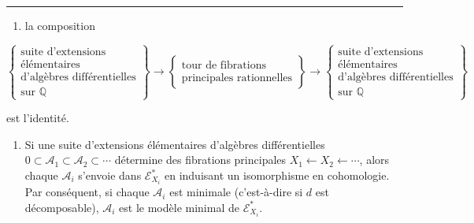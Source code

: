 \documentclass[
  french,
  a3paper,
  a3paper]{extarticle}
\providecommand{\tightlist}{%
  \setlength{\itemsep}{0pt}\setlength{\parskip}{0pt}}
\begin{document}


\par

\vspace{0.7mm}\hrule\vspace{1.6mm}

\fontsize{9}{11}\selectfont

\begin{enumerate}
\def\labelenumi{\arabic{enumi})}
\setcounter{enumi}{1}
\tightlist
\item
  la composition
\end{enumerate}

\[\left\{\begin{array}{c}\text{suite d'extensions}\\\text{élémentaires}\\\text{d'algèbres différentielles}\\\text{sur }\mathbb Q\end{array}\right\}\longrightarrow\left\{\begin{array}{c}\text{tour de fibrations}\\\text{principales rationnelles}\end{array}\right\}\longrightarrow\left\{\begin{array}{c}\text{suite d'extensions}\\\text{élémentaires}\\\text{d'algèbres différentielles}\\\text{sur }\mathbb Q\end{array}\right\}\]

est l'identité.

\begin{enumerate}
\def\labelenumi{\arabic{enumi})}
\setcounter{enumi}{2}
\tightlist
\item
  Si une suite d'extensions élémentaires d'algèbres différentielles
  \(0\subset\mathcal A_1\subset\mathcal A_2\subset\cdots\) détermine des
  fibrations principales \(X_1\longleftarrow X_2\longleftarrow\cdots\),
  alors chaque \(\mathcal A_i\) s'envoie dans \(\mathcal E_{X_i}^*\) en
  induisant un isomorphisme en cohomologie. Par conséquent, si chaque
  \(\mathcal A_i\) est minimale (c'est-à-dire si \(d\) est
  décomposable), \(\mathcal A_i\) est le modèle minimal de
  \(\mathcal E_{X_i}^*\).
\end{enumerate}
\end{document}
